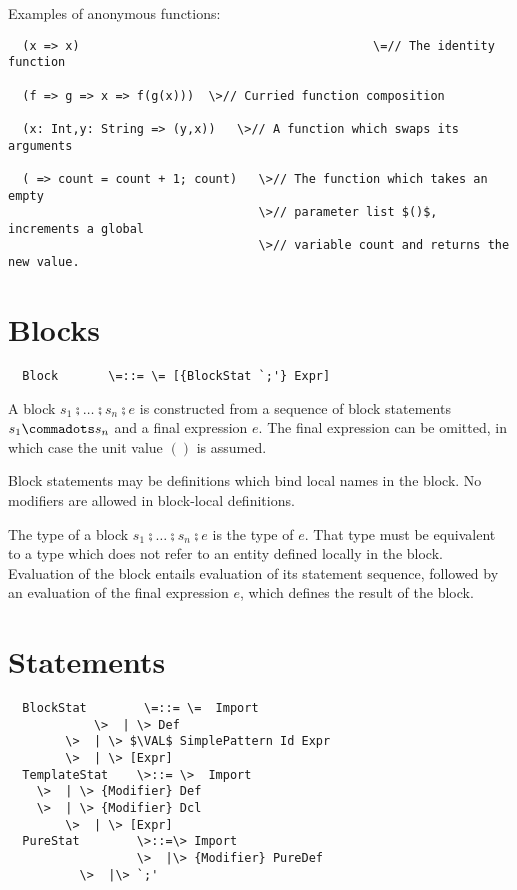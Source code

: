 \documentclass[11pt]{report}
\begin{document}
\begin{itemize}
\example Examples of anonymous functions:

\begin{verbatim}
  (x => x)                                         \=// The identity function

  (f => g => x => f(g(x)))	\>// Curried function composition

  (x: Int,y: String => (y,x))   \>// A function which swaps its arguments

  ( => count = count + 1; count)   \>// The function which takes an empty
                                   \>// parameter list $()$, increments a global
                                   \>// variable count and returns the new value.
\end{verbatim}

\section{Blocks}
\label{sec:blocks}

\syntax\begin{verbatim}
  Block       \=::= \= [{BlockStat `;'} Expr]
\end{verbatim}

A block $s_1 \semi\ldots\semi s_n \semi e$
is constructed from a sequence of block statements $s_1 \commadots s_n$
and a final expression $e$. The final expression can be omitted, in
which case the unit value $()$ is assumed.

Block statements may be definitions which bind local names in the
block. No modifiers are allowed in block-local definitions.


The type of a block $s_1 \semi\ldots\semi s_n \semi e$ is the type of $e$.  That
type must be equivalent to a type which does not refer to an entity
defined locally in the block.
Evaluation of the block entails
evaluation of its statement sequence, followed by an evaluation of the final expression
$e$, which defines the result of the block.

\section{Statements}
\label{sec:statements}

\syntax\begin{verbatim}
  BlockStat        \=::= \=  Import
            \>  | \> Def
	    \>  | \> $\VAL$ SimplePattern Id Expr
	    \>  | \> [Expr]
  TemplateStat    \>::= \>  Import
	\>  | \> {Modifier} Def
	\>  | \> {Modifier} Dcl
        \>  | \> [Expr]
  PureStat        \>::=\> Import
                  \>  |\> {Modifier} PureDef
		  \>  |\> `;'
\end{verbatim}


\end{itemize}
\end{document}
